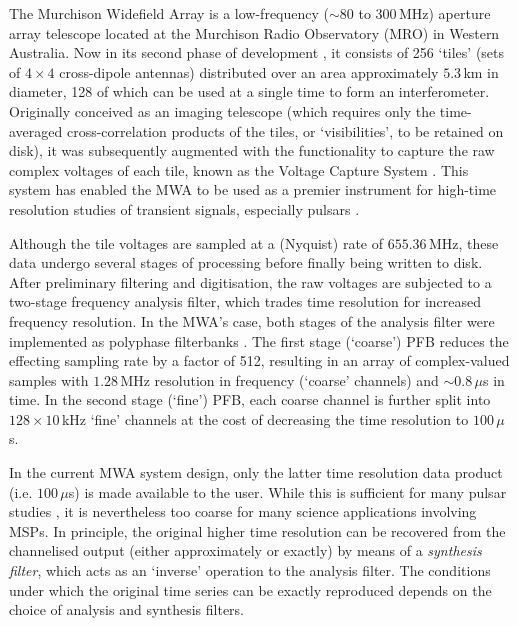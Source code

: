 \documentclass{pasa}%
\begin{document}
The Murchison Widefield Array \citep[MWA;][]{Tingay2013} is a low-frequency ($\sim80$ to $300\,$MHz) aperture array telescope located at the Murchison Radio Observatory (MRO) in Western Australia.
Now in its second phase of development \citep[Phase II;][]{Wayth2018}, it consists of 256 `tiles' (sets of $4\times4$ cross-dipole antennas) distributed over an area approximately $5.3\,$km in diameter, 128 of which can be used at a single time to form an interferometer.
Originally conceived as an imaging telescope (which requires only the time-averaged cross-correlation products of the tiles, or `visibilities', to be retained on disk), it was subsequently augmented with the functionality to capture the raw complex voltages of each tile, known as the Voltage Capture System \citep[VCS;][]{Tremblay2015}.
This system has enabled the MWA to be used as a premier instrument for high-time resolution studies of transient signals, especially pulsars \citep[e.g.][]{Bhat2016,McSweeney2017,Meyers2018,Kirsten2019}.

Although the tile voltages are sampled at a (Nyquist) rate of $655.36\,$MHz, these data undergo several stages of processing before finally being written to disk.
After preliminary filtering and digitisation, the raw voltages are subjected to a two-stage frequency analysis filter, which trades time resolution for increased frequency resolution.
In the MWA's case, both stages of the analysis filter were implemented as polyphase filterbanks \citep[PFBs;][]{Harris2011,Prabu2015}.
The first stage (`coarse') PFB reduces the effecting sampling rate by a factor of 512, resulting in an array of complex-valued samples with $1.28\,$MHz resolution in frequency (`coarse' channels) and $\sim0.8\,\mu$s in time.
In the second stage (`fine') PFB, each coarse channel is further split into $128 \times 10\,$kHz `fine' channels at the cost of decreasing the time resolution to $100\,\mu$s.

In the current MWA system design, only the latter time resolution data product (i.e. $100\,\mu$s) is made available to the user.
While this is sufficient for many pulsar studies \citep[e.g.][]{Oronsaye2015,McSweeney2017,Bhat2018,Meyers2018}, it is nevertheless too coarse for many science applications involving MSPs.
In principle, the original higher time resolution can be recovered from the channelised output (either approximately or exactly) by means of a \textit{synthesis filter}, which acts as an `inverse' operation to the analysis filter.
The conditions under which the original time series can be exactly reproduced depends on the choice of analysis and synthesis filters.
\end{document}
